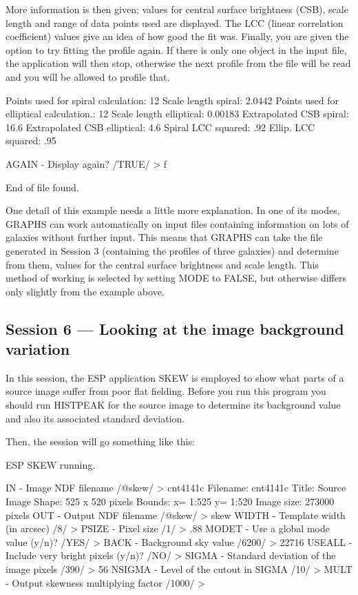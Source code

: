 \documentclass[twoside,11pt]{starlink}
\begin{document}
More information is then given;
values for central surface brightness (CSB), scale length and
range of data points used are displayed. The LCC (linear correlation
coefficient) values give an idea of how good the fit was. Finally, you are
given the option to try fitting the profile again. If there is only one
object in the input file, the application will then stop, otherwise the
next profile from the file will be read and you will be allowed to profile
that.

\begin{terminalv}
Points used for spiral calculation:        12
Scale length spiral:                   2.0442
Points used for elliptical calculation.:   12
Scale length elliptical:              0.00183
Extrapolated CSB spiral:              16.6
Extrapolated CSB elliptical:           4.6
Spiral LCC squared:                    .92
Ellip. LCC squared:                    .95

AGAIN - Display again? /TRUE/ > f

End of file found.
\end{terminalv}

One detail of this example needs a little more explanation. In one
of its modes, GRAPHS can work automatically on input files
containing information on lots of galaxies without further
input. This means that GRAPHS can take the file generated in Session
3 (containing the profiles of three galaxies) and determine from them,
values for the central surface brightness and scale length.
This method of working is selected by setting MODE to FALSE, but otherwise
differs only slightly from the example above.



\subsection{Session 6 --- Looking at the image background variation}
In this  session, the ESP application SKEW is employed to show
what parts of a source image suffer from poor flat fielding.
Before you run this program you should run HISTPEAK for the source image to
determine its background value and also its associated standard deviation.

Then, the session will go something like this:

\begin{terminalv}

ESP SKEW running.

IN - Image NDF filename /@skew/ > cnt4141c
Filename:   cnt4141c
Title:      Source Image
Shape:      525 x 520 pixels
Bounds:     x= 1:525  y= 1:520
Image size: 273000 pixels
OUT - Output NDF filename /@skew/ > skew
WIDTH - Template width (in arcsec) /8/ >
PSIZE - Pixel size /1/ > .88
MODET - Use a global mode value (y/n)? /YES/ >
BACK - Background sky value /6200/ > 22716
USEALL - Include very bright pixels (y/n)? /NO/ >
SIGMA - Standard deviation of the image pixels /390/ > 56
NSIGMA - Level of the cutout in SIGMA /10/ >
MULT - Output skewness multiplying factor /1000/ >
\end{terminalv}
\end{document}
